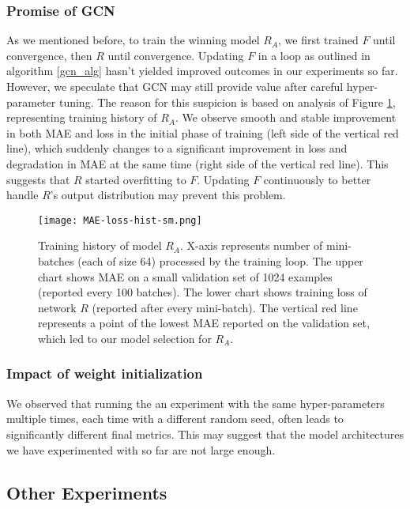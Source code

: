 \documentclass[conference]{IEEEtran}
\begin{document}
\subsubsection{Promise of GCN}
\label{promise}
As we mentioned before, to train the winning model $R_A$, we first trained $F$ until convergence, then $R$ until convergence. Updating $F$ in a loop as outlined in algorithm \ref{gcn_alg} hasn't yielded improved outcomes in our experiments so far. However, we speculate that GCN may still provide value after careful hyper-parameter tuning. The reason for this suspicion is based on analysis of Figure \ref{fig:mae-loss}, representing training history of $R_A$. We observe smooth and stable improvement in both MAE and loss in the initial phase of training (left side of the vertical red line), which suddenly changes to a significant improvement in loss and degradation in MAE at the same time (right side of the vertical red line). This suggests that $R$ started overfitting to $F$. Updating $F$ continuously to better handle $R$'s output distribution may prevent this problem.

\begin{figure}[!h]
    \centering
    \texttt{[image: MAE-loss-hist-sm.png]}
    \caption{Training history of model $R_A$. X-axis represents number of mini-batches (each of size 64) processed by the training loop. The upper chart shows MAE on a small validation set of 1024 examples (reported every 100 batches). The lower chart shows training loss of network $R$ (reported after every mini-batch). The vertical red line represents a point of the lowest MAE reported on the validation set, which led to our model selection for $R_A$.}
    \label{fig:mae-loss}
\end{figure}

\subsubsection{Impact of weight initialization}
We observed that running the an experiment with the same hyper-parameters multiple times, each time with a different random seed, often leads to significantly different final metrics. This may suggest that the model architectures we have experimented with so far are not large enough.

\subsection{Other Experiments}
\end{document}

